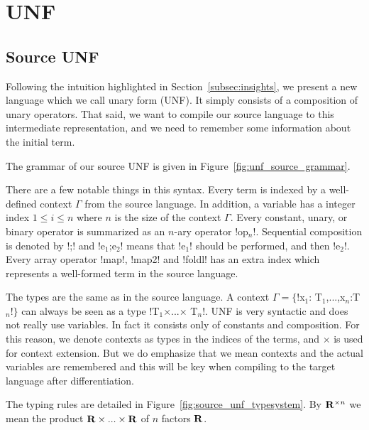 \section{UNF}
\label{sec:unf}

\subsection{Source UNF} %
\label{sub:Source UNF}

Following the intuition highlighted in Section~\ref{subsec:insights}, we present a new language which we call unary form (UNF). 
It simply consists of a composition of unary operators. That said, we want to compile our source language to this intermediate representation, 
and we need to remember some information about the initial term. 

The grammar of our source UNF is given in Figure~\ref{fig:unf_source_grammar}. 



There are a few notable things in this syntax. 
Every term is indexed by a well-defined context $\Gamma$ from the source language.
In addition, a variable has a integer index $1\leq i\leq n$ where $n$ is the size of the context $\Gamma$.
Every constant, unary, or binary operator is summarized as an $n$-ary operator !op$_n$!.
Sequential composition is denoted by !;! and !e$_{1}$;e$_{2}$! means that !e$_{1}$! should be performed, and then !e$_{2}$!.
Every array operator !map!, !map2! and !foldl! has an extra index which represents a well-formed term in the source language.

The types are the same as in the source language. 
A context $\Gamma=\{$!x$_{1}$: T$_{1}$,...,x$_n$:T$_n$!$\}$ can always be seen as a type !T$_{1}$$\times$...$\times$ T$_n$!.
UNF is very syntactic and does not really use variables. 
In fact it consists only of constants and composition. 
For this reason, we denote contexts as types in the indices of the terms, and $\times$ is used for context extension.
But we do emphasize that we mean contexts and the actual variables are remembered and
this will be key when compiling to the target language after differentiation. 

The typing rules are detailed in Figure~\ref{fig:source_unf_typesystem}.
By $\mathbf{R}^{\times n}$ we mean the product $\mathbf{R}\times...\times\mathbf{R}$ of $n$ factors $\mathbf{R}$.


